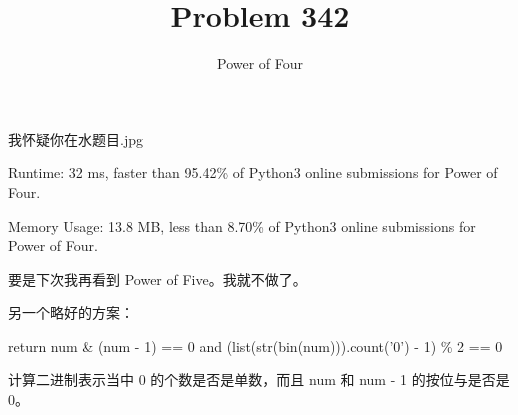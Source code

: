 \documentclass[UTF8]{ctexart}
\title{Problem 342}
\author{Power of Four}
\begin{document}
\maketitle

我怀疑你在水题目.jpg

Runtime: 32 ms, faster than 95.42\% of Python3 online submissions for Power of Four.

Memory Usage: 13.8 MB, less than 8.70\% of Python3 online submissions for Power of Four.

要是下次我再看到 Power of Five。我就不做了。

另一个略好的方案：

      return num & (num - 1) == 0 and (list(str(bin(num))).count('0') - 1) \% 2 == 0
      
计算二进制表示当中 0 的个数是否是单数，而且 num 和 num - 1 的按位与是否是 0。
\end{document}
